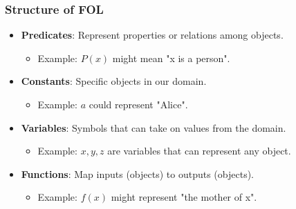 \documentclass[aspectratio=169]{beamer}
\begin{document}
\begin{frame}[fragile]
    \frametitle{Structure of FOL}
    \begin{itemize}
        \item \textbf{Predicates}: Represent properties or relations among objects. 
        \begin{itemize}
            \item Example: \( P(x) \) might mean "x is a person".
        \end{itemize}
        
        \item \textbf{Constants}: Specific objects in our domain.
        \begin{itemize}
            \item Example: \( a \) could represent "Alice".
        \end{itemize}
        
        \item \textbf{Variables}: Symbols that can take on values from the domain.
        \begin{itemize}
            \item Example: \( x, y, z \) are variables that can represent any object.
        \end{itemize}
        
        \item \textbf{Functions}: Map inputs (objects) to outputs (objects).
        \begin{itemize}
            \item Example: \( f(x) \) might represent "the mother of x".
        \end{itemize}
    \end{itemize}
\end{frame}
\end{document}
